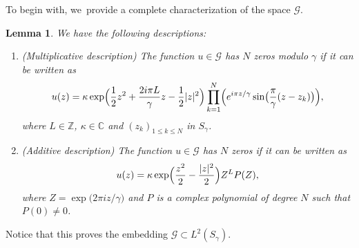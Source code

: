 \documentclass[JEP,XML,SOM,Unicode,NoFloatCountersInSection,published]{cedram}
\newtheorem{lemme}[theorem]{Lemma}
\theoremstyle{definition}
\let\EE\exp
\newcommand\C{\mathbb C}
\begin{document}
To begin with, we~provide a complete characterization of the space $\mathcal{G}$.
\begin{lemme} \label{lem77}
We have the following descriptions:
\begin{enumerate}
\item (Multiplicative description) The function $u \in \mathcal{G}$ has $N$ zeros modulo $\gamma$ if it can be written as\vspace*{-3pt}
\begin{equation*}
u(z)=\kappa \EE\Bigl({\frac{1}{2} z^2 +\frac{2i\pi L}{\gamma}z- \frac{1}{2} |z|^2} \Bigr) \prod_{k=1}^N\Bigl(e^{{i\pi z}/{\gamma} }\sin\bigl(\frac{\pi}{\gamma}(z-z_k)\bigr)\Bigr),
\end{equation*}
where $L \in\mathbb{Z}$, $\kappa \in \C$ and $(z_k)_{1\leq k\leq N}$ in $S_\gamma$.
\item (Additive description) The function $u \in \mathcal{G}$ has $N$ zeros if it can be written as\vspace*{-3pt}
\begin{equation*}
u(z)=\kappa \EE\Bigl(\frac{z^2}2 - \frac{|z|^2}2\Bigr) Z^L P(Z),
\end{equation*}
where $Z = \EE\bigl({{2\pi i z}/{\gamma}}\bigr)$ and $P$ is a complex polynomial of degree $N$ such that ${P(0) \neq 0}$.
\end{enumerate}
\end{lemme}

Notice that this proves the embedding $\mathcal{G} \subset L^2(S_{\gamma})$.
\end{document}
